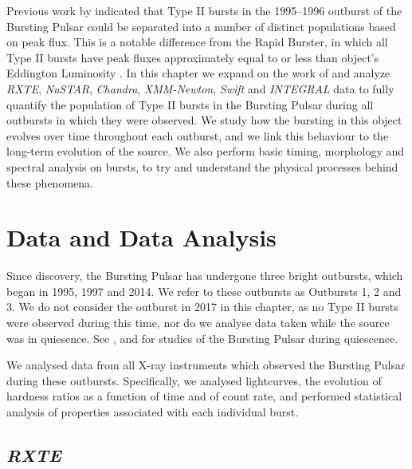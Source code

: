 \par Previous work by \citet{Giles_BP} indicated that Type II bursts in the 1995--1996 outburst of the Bursting Pulsar could be separated into a number of distinct populations based on peak flux.  This is a notable difference from the Rapid Burster, in which all Type II bursts have peak fluxes approximately equal to or less than object's Eddington Luminosity \citep{Tan_RBBursts}.  In this chapter we expand on the work of \citet{Giles_BP} and analyze \textit{RXTE}, \textit{NuSTAR}, \textit{Chandra}, \textit{XMM-Newton}, \textit{Swift} and \textit{INTEGRAL} data to fully quantify the population of Type II bursts in the Bursting Pulsar during all outbursts in which they were observed.  We study how the bursting in this object evolves over time throughout each outburst, and we link this behaviour to the long-term evolution of the source.  We also perform basic timing, morphology and spectral analysis on bursts, to try and understand the physical processes behind these phenomena.  %

\section{Data and Data Analysis}

\par Since discovery, the Bursting Pulsar has undergone three bright outbursts, which began in 1995, 1997 and 2014.  We refer to these outbursts as Outbursts 1, 2 and 3.  We do not consider the outburst in 2017 in this chapter, as no Type II bursts were observed during this time, nor do we analyse data taken while the source was in quiesence.  See \citet{Daigne_BPQ}, \citet{Wijnands_BPQ} and \citet{Degenaar_BPQuiescence} for studies of the Bursting Pulsar during quiescence.
\par We analysed data from all X-ray instruments which observed the Bursting Pulsar during these outbursts.  Specifically, we analysed lightcurves, the evolution of hardness ratios as a function of time and of count rate, and performed statistical analysis of properties associated with each individual burst.

\subsection{\textit{RXTE}}

